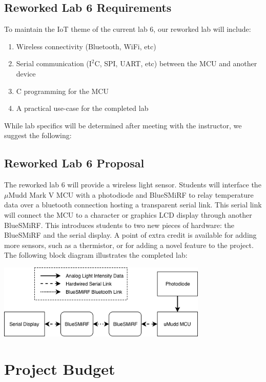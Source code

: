 \documentclass[12pt]{article}
\begin{document}
\subsection{Reworked Lab 6 Requirements}

To maintain the IoT theme of the current lab 6, our reworked lab will include:

\begin{enumerate}
	\item Wireless connectivity (Bluetooth, WiFi, etc)
	\item Serial communication ($\text{I}^2\text{C}$, SPI, UART, etc) between the MCU and another device
	\item C programming for the MCU
	\item A practical use-case for the completed lab
\end{enumerate} 

\hspace{-0.8cm} While lab specifics will be determined after meeting with the instructor, we suggest the following:

\subsection{Reworked Lab 6 Proposal}

The reworked lab 6 will provide a wireless light sensor. Students will interface the $\mu$Mudd Mark V MCU with a photodiode and BlueSMiRF to relay temperature data over a bluetooth connection hosting a transparent serial link. This serial link will connect the MCU to a character or graphics LCD display through another BlueSMiRF. This introduces students to two new pieces of hardware: the BlueSMiRF and the serial display. A point of extra credit is available for adding more sensors, such as a thermistor, or for adding a novel feature to the project. The following block diagram illustrates the completed lab:

\begin{center}
	\includegraphics[width=10cm]{lab6_proposal}
\end{center}


\section{Project Budget}
\end{document}
